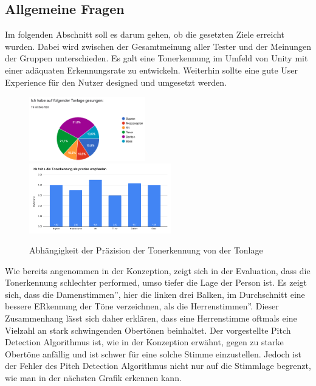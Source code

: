 \subsection*{Allgemeine Fragen}
Im folgenden Abschnitt soll es darum gehen, ob die gesetzten Ziele erreicht wurden. Dabei wird zwischen der Gesamtmeinung aller Tester und der Meinungen der Gruppen unterschieden. Es galt eine Tonerkennung im Umfeld von Unity mit einer adäquaten Erkennungsrate zu entwickeln. Weiterhin sollte eine gute User Experience für den Nutzer designed und umgesetzt werden. 
\begin{figure}[H]
    \includegraphics[width=0.45\textwidth]{Bilder/eval-tonart.png}
    \includegraphics[width=0.55\textwidth]{Bilder/eval-tonerkennung-vergleichLagen.png}
    \caption{Abhängigkeit der Präzision der Tonerkennung von der Tonlage}
\end{figure}
Wie bereits angenommen in der Konzeption, zeigt sich in der Evaluation, dass die Tonerkennung schlechter performed, umso tiefer die Lage der Person ist. Es zeigt sich, dass die \glqq Damenstimmen'', hier die linken drei Balken, im Durchschnitt eine bessere ERkennung der Töne verzeichnen, als die \glqq Herrenstimmen''. Dieser Zusammenhang lässt sich daher erklären, dass eine Herrenstimme oftmals eine Vielzahl an stark schwingenden Obertönen beinhaltet. Der vorgestellte Pitch Detection Algorithmus ist, wie in der Konzeption erwähnt, gegen zu starke Obertöne anfällig und ist schwer für eine solche Stimme einzustellen. Jedoch ist der Fehler des Pitch Detection Algorithmus nicht nur auf die Stimmlage begrenzt, wie man in der nächsten Grafik erkennen kann. 
